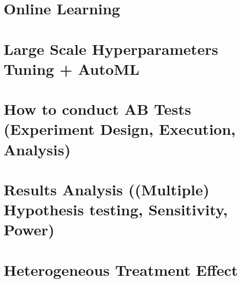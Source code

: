 \documentclass[12pt]{article}
\numberwithin{equation}{section}
\begin{document}
\section{Online Learning}

\section{Large Scale Hyperparameters Tuning + AutoML}

\section{How to conduct AB Tests (Experiment Design, Execution, Analysis)}

\section{Results Analysis ((Multiple) Hypothesis testing, Sensitivity, Power)}

\section{Heterogeneous Treatment Effect}

\nocite{*}








\end{document}

